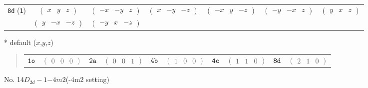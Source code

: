 \documentclass[fleqn,9pt,landscape]{jsarticle}
\begin{document}
\begin{center}
\begin{longtable}{ccccccc}
{\tt 8d} ({\tt 1}) & $ \begin{pmatrix} x & y & z \end{pmatrix} $ & $ \begin{pmatrix} - x & - y & z \end{pmatrix} $ & $ \begin{pmatrix} x & - y & - z \end{pmatrix} $ & $ \begin{pmatrix} - x & y & - z \end{pmatrix} $ & $ \begin{pmatrix} - y & - x & z \end{pmatrix} $ & $ \begin{pmatrix} y & x & z \end{pmatrix} $ \\
& $ \begin{pmatrix} y & - x & - z \end{pmatrix} $ & $ \begin{pmatrix} - y & x & - z \end{pmatrix} $ & $  $ & $  $ & $  $ & $  $ \\
\end{longtable}
\end{center}
* default ($x$,$y$,$z$)
\begin{quote}
\begin{tabular}{cccccccccc}
$ {\tt 1o} $ & $ \begin{pmatrix} 0 & 0 & 0 \end{pmatrix} $ & $ {\tt 2a} $ & $ \begin{pmatrix} 0 & 0 & 1 \end{pmatrix} $ & $ {\tt 4b} $ & $ \begin{pmatrix} 1 & 0 & 0 \end{pmatrix} $ & $ {\tt 4c} $ & $ \begin{pmatrix} 1 & 1 & 0 \end{pmatrix} $ & $ {\tt 8d} $ & $ \begin{pmatrix} 2 & 1 & 0 \end{pmatrix} $
\end{tabular}
\end{quote}
\newpage
No. 14\quad$D_{2d}-1$\quad$-4m2$\quad(-4m2 setting)\quad[ tetragonal ]
\end{document}
